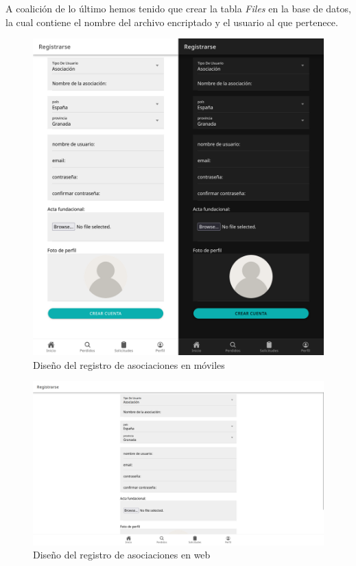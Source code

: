 A coalición de lo último hemos tenido que crear la tabla \textit{Files} en la base de datos, la cual contiene el nombre del archivo encriptado y el usuario al que pertenece.

\begin{figure} [H]
	\centering
	\includegraphics[width=1\linewidth]{sprint 3//hu8/implementacion.png}
	\caption{Diseño del registro de asociaciones en móviles}
	\label{fig:impRegAso}
\end{figure}

\begin{figure}[H]
	\centering
	\includegraphics[width=1\linewidth]{sprint 3//hu8/implementacionWeb.png}
	\caption{Diseño del registro de asociaciones en web}
\end{figure}

